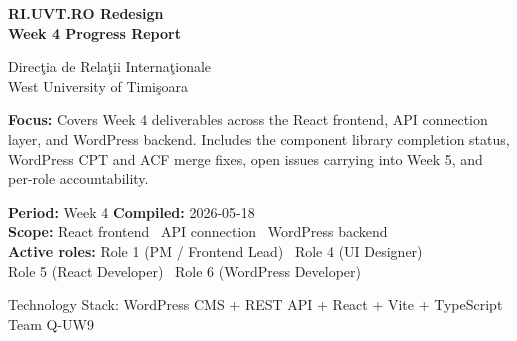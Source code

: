 \documentclass[12pt,a4paper]{article}
\begin{document}
\color{textGray}

\begin{titlepage}
    \pagecolor{uvtDarkBlue}
    \color{white}

    \vspace*{2cm}

    {\Huge\bfseries RI.UVT.RO Redesign\\[0.35em]
    Week 4 Progress Report\par}

    \vspace{0.8cm}

    {\Large Direc\c{t}ia de Rela\c{t}ii Interna\c{t}ionale\\
    West University of Timi\c{s}oara\par}

    \vspace{1.5cm}

    \begin{yellowbox}
        \color{textGray}
        \textbf{Focus:} Covers Week 4 deliverables across the React frontend,
        API connection layer, and WordPress backend. Includes the component
        library completion status, WordPress CPT and ACF merge fixes, open
        issues carrying into Week 5, and per-role accountability.
    \end{yellowbox}

    \vspace{1.2cm}

    \begin{bluebox}
        \color{uvtDarkBlue}
        \textbf{Period:} Week 4 \quad\textbf{Compiled:} 2026-05-18\\[4pt]
        \textbf{Scope:} React frontend \textbullet\ API connection \textbullet\ WordPress backend\\[4pt]
        \textbf{Active roles:} Role 1 (PM / Frontend Lead) \textbullet\ Role 4 (UI Designer)\\
         Role 5 (React Developer) \textbullet\ Role 6 (WordPress Developer)
    \end{bluebox}

    \vfill

    {\large Technology Stack: WordPress CMS + REST API + React + Vite + TypeScript\\[4pt]
    Team Q-UW9}

    \vspace{1cm}
\end{titlepage}
\end{document}
